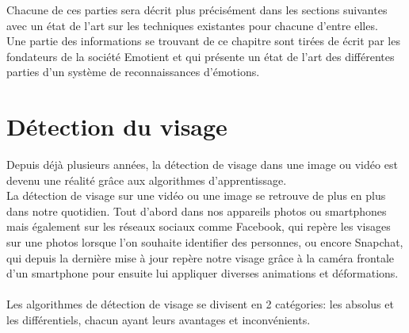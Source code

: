 \documentclass[overfullbox, poster]{polytech/polytech}
\begin{document}
Chacune de ces parties sera décrit plus précisément dans les sections suivantes avec un état de l'art sur les techniques existantes pour chacune d'entre elles.\\
Une partie des informations se trouvant de ce chapitre sont tirées de \cite{sota2d} écrit par les fondateurs de la société Emotient et qui présente un état de l'art des différentes parties d'un système de reconnaissances d'émotions.

\newpage
\section{Détection du visage}
Depuis déjà plusieurs années, la détection de visage dans une image ou vidéo est devenu une réalité grâce aux algorithmes d'apprentissage.\\
La détection de visage sur une vidéo ou une image se retrouve de plus en plus dans notre quotidien. Tout d'abord dans nos appareils photos ou smartphones mais également sur les réseaux sociaux comme Facebook, qui repère les visages sur une photos lorsque l'on souhaite identifier des personnes, ou encore Snapchat, qui depuis la dernière mise à jour repère notre visage grâce à la caméra frontale d'un smartphone pour ensuite lui appliquer diverses animations et déformations.\\
\\
Les algorithmes de détection de visage se divisent en 2 catégories: les absolus et les différentiels, chacun ayant leurs avantages et inconvénients.\\
\end{document}
